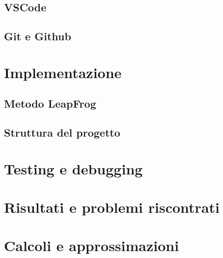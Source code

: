 \documentclass{article}
\begin{document}
\subsection{VSCode}
\subsection{Git e Github}
\section{Implementazione}
\subsection{Metodo LeapFrog}

\subsection{Struttura del progetto}

\section{Testing e debugging}

\section{Risultati e problemi riscontrati}
\appendix
\section{Calcoli e approssimazioni}
\end{document}
